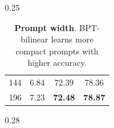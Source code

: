 \begin{table}[t]
\begin{subtable}[t]{0.25\textwidth}
{\begin{tabular}{cccc}
        144                      & 6.84 & 72.39 & 78.36\\
        196                      & 7.23 & \textbf{72.48} & \textbf{78.87}\\
        \bottomrule
        \end{tabular}
        }
        \label{tab:prompt-length}
    \end{subtable}
    \hfill
    \begin{subtable}[t]{0.28\textwidth}
        \renewcommand{\arraystretch}{1.1}
        \centering
        \caption{
        \textbf{Prompt width}. BPT-bilinear learns more compact prompts with higher accuracy.
        }
        \label{tab:prompt-width}
    \end{subtable}
\vspace{-1mm}
\label{tab:ablation}
\end{table}
\setlength{\tabcolsep}{0.6em}
